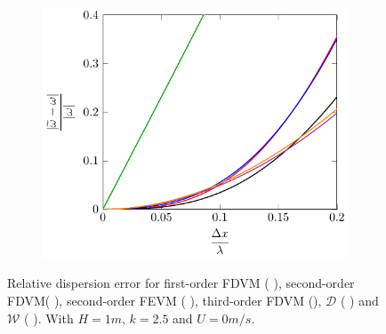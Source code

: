 \begin{figure}
	\begin{subfigure}{0.5\textwidth}
		\includegraphics[width=\textwidth]{./chp4/figures/Dispu0khFillz.pdf}
	\end{subfigure}
	\caption{Relative dispersion error for first-order FDVM ({\color{green!60!black} \solidrule}), second-order FDVM({\color{red} \solidrule}), second-order FEVM ({\color{blue} \solidrule}), third-order FDVM ({\solidrule}), $\mathcal{D}$ ({\color{violet!80!white} \solidrule}) and $\mathcal{W}$ ({\color{orange} \solidrule}). With $H = 1m$, $k = 2.5$ and $U = 0m/s$.}
	\label{fig:Dispu0Fill}
\end{figure}

